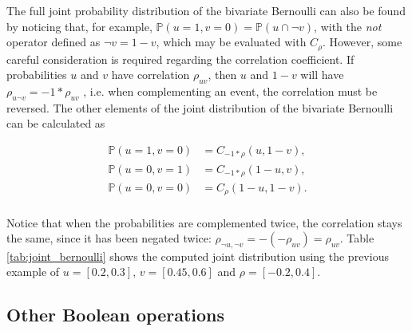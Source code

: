 \documentclass[runningheads]{llncs}
\begin{document}
The full joint probability distribution of the bivariate Bernoulli can also be found by noticing that, for example, $\mathbb{P}(u =1, v = 0) = \mathbb{P}(u \cap \neg v)$, with the \textit{not} operator defined as $\neg v = 1 - v$, which may be evaluated with $C_{\rho}$. However, some careful consideration is required regarding the correlation coefficient. If probabilities $u$ and $v$ have correlation $\rho_{uv}$, then $u$ and $1-v$ will have $\rho_{u\neg v} = -1 * \rho_{uv}$ \cite{nelsen2007introduction}, i.e. when complementing an event, the correlation must be reversed. The other elements of the joint distribution of the bivariate Bernoulli can be calculated as

\begin{align*}
   \mathbb{P}(u=1, v = 0) &= C_{-1*\rho}(u, 1 - v) ,\\
    \mathbb{P}(u=0, v = 1) &= C_{-1*\rho}(1 - u, v) ,\\
    \mathbb{P}(u=0, v = 0) &= C_{\rho}(1- u, 1 - v) .\\
\end{align*}

\noindent Notice that when the probabilities are complemented twice, the correlation stays the same, since it has been negated twice: $\rho_{\neg u, \neg v} = -(-\rho_{uv}) = \rho_{uv}$. Table \ref{tab:joint_bernoulli} shows the computed joint distribution using the previous example of $u = [0.2,0.3]$, $v = [0.45,0.6]$ and $\rho =[ -0.2, 0.4]$.

\begin{table}[t!]
\centering
\caption{Interval bounds on the joint probability of a bivariate Bernoulli with marginals $\mathbb{P}(u=1) = [0.2, 0.3]$ , $\mathbb{P}(v=1) = [0.45, 0.5]$ and interval correlation $\rho = [ -0.2, 0.4]$.}
\label{tab:joint_bernoulli}
\end{table}

\subsection{Other Boolean operations}
\end{document}
